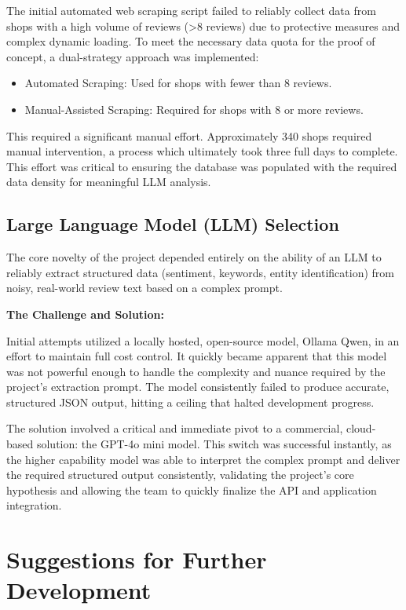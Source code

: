 The initial automated web scraping script failed to reliably collect data from shops with a high volume of reviews (>8 reviews) due to protective measures and complex dynamic loading. To meet the necessary data quota for the proof of concept, a dual-strategy approach was implemented:

\begin{itemize}
	\item Automated Scraping: Used for shops with fewer than 8 reviews.
	\item Manual-Assisted Scraping: Required for shops with 8 or more reviews.
\end{itemize}

This required a significant manual effort. Approximately 340 shops required manual intervention, a process which ultimately took three full days to complete. This effort was critical to ensuring the database was populated with the required data density for meaningful LLM analysis.

\subsection{Large Language Model (LLM) Selection}

The core novelty of the project depended entirely on the ability of an LLM to reliably extract structured data (sentiment, keywords, entity identification) from noisy, real-world review text based on a complex prompt.

\textbf{The Challenge and Solution:}

Initial attempts utilized a locally hosted, open-source model, Ollama Qwen, in an effort to maintain full cost control. It quickly became apparent that this model was not powerful enough to handle the complexity and nuance required by the project's extraction prompt. The model consistently failed to produce accurate, structured JSON output, hitting a ceiling that halted development progress.

The solution involved a critical and immediate pivot to a commercial, cloud-based solution: the GPT-4o mini model. This switch was successful instantly, as the higher capability model was able to interpret the complex prompt and deliver the required structured output consistently, validating the project's core hypothesis and allowing the team to quickly finalize the API and application integration.

\section{Suggestions for Further Development}

